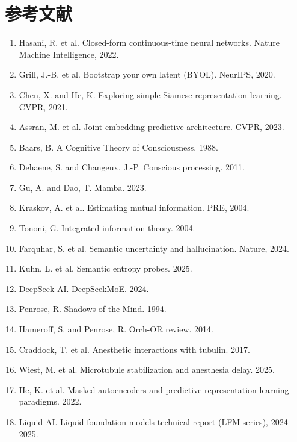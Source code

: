 \documentclass[10pt,twocolumn]{ctexart}
\begin{document}
\section*{参考文献}
\begin{enumerate}
\item Hasani, R. et al. Closed-form continuous-time neural networks. Nature Machine Intelligence, 2022.
\item Grill, J.-B. et al. Bootstrap your own latent (BYOL). NeurIPS, 2020.
\item Chen, X. and He, K. Exploring simple Siamese representation learning. CVPR, 2021.
\item Assran, M. et al. Joint-embedding predictive architecture. CVPR, 2023.
\item Baars, B. A Cognitive Theory of Consciousness. 1988.
\item Dehaene, S. and Changeux, J.-P. Conscious processing. 2011.
\item Gu, A. and Dao, T. Mamba. 2023.
\item Kraskov, A. et al. Estimating mutual information. PRE, 2004.
\item Tononi, G. Integrated information theory. 2004.
\item Farquhar, S. et al. Semantic uncertainty and hallucination. Nature, 2024.
\item Kuhn, L. et al. Semantic entropy probes. 2025.
\item DeepSeek-AI. DeepSeekMoE. 2024.
\item Penrose, R. Shadows of the Mind. 1994.
\item Hameroff, S. and Penrose, R. Orch-OR review. 2014.
\item Craddock, T. et al. Anesthetic interactions with tubulin. 2017.
\item Wiest, M. et al. Microtubule stabilization and anesthesia delay. 2025.
\item He, K. et al. Masked autoencoders and predictive representation learning paradigms. 2022.
\item Liquid AI. Liquid foundation models technical report (LFM series), 2024--2025.
\end{enumerate}
\end{document}
